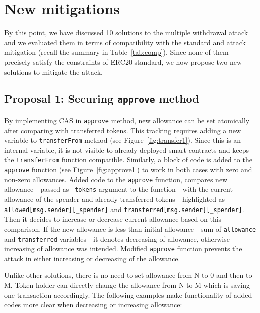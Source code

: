 
\section{New mitigations}

By this point, we have discussed 10 solutions to the multiple withdrawal attack and we evaluated them in terms of compatibility with the standard and attack mitigation (recall the summary in Table~\ref{tab:comp}). Since none of them precisely satisfy the constraints of ERC20 standard, we now propose two new solutions to mitigate the attack.

\subsection{Proposal 1: Securing \texttt{approve} method}\label{sec:proposal1}

By implementing CAS \cite{Ref06} in \texttt{approve} method, new allowance can be set atomically after comparing with transferred tokens. This tracking requires adding a new variable to \texttt{transferFrom} method (see Figure~\ref{fig:transfer1}). Since this is an internal variable, it is not visible to already deployed smart contracts and keeps the \texttt{transferFrom} function compatible. Similarly, a block of code is added to the \texttt{approve} function (see Figure~\ref{fig:approve1}) to work in both cases with zero and non-zero allowances. Added code to the \texttt{approve} function, compares new allowance---passed as \texttt{\_tokens} argument to the function---with the current allowance of the spender and already transferred tokens---highlighted as \texttt{allowed[msg.sender][\_spender]} and \texttt{transferred[msg.sender][\_spender]}. Then it decides to increase or decrease current allowance based on this comparison. If the new allowance is less than initial allowance---sum of \texttt{allowance} and \texttt{transferred} variables---it denotes decreasing of allowance, otherwise increasing of allowance was intended. Modified \texttt{approve} function prevents the attack in either increasing or decreasing of the allowance.

Unlike other solutions, there is no need to set allowance from N to 0 and then to M. Token holder can directly change the allowance from N to M which is saving one transaction accordingly. The following examples make functionality of added codes more clear when decreasing or increasing allowance:
 
